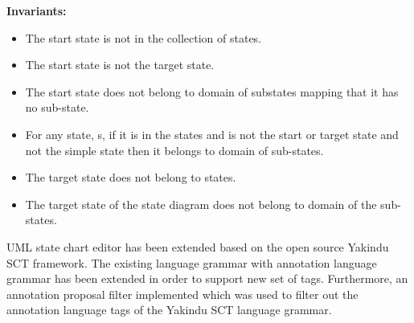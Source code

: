 \textbf{Invariants:}
\begin{itemize}
\item The start state is not in the collection of states.
\item The start state is not the target state.
\item The start state does not belong to domain of substates
mapping that it has no sub-state.
\item For any state, s, if it is in the states and is not the start or target state and not the simple state then it belongs to domain of sub-states.
\item The target state does not belong to states.
\item The target state of the state diagram does not belong to domain of the sub-states.
\end{itemize}

UML state chart editor has been extended based on the open source Yakindu SCT \cite{ref_15_yakindu:sct}framework. The existing language grammar with
annotation language grammar has been extended in order to support new set
of tags. Furthermore, an annotation proposal filter implemented which was used to filter out the annotation language tags of the Yakindu SCT language grammar.

